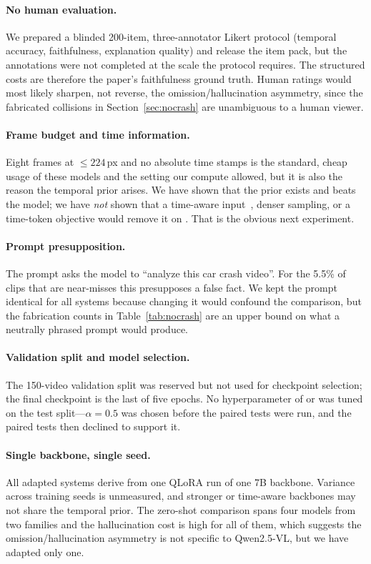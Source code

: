 \paragraph{No human evaluation.}
We prepared a blinded 200-item, three-annotator Likert protocol (temporal accuracy, faithfulness, explanation quality) and release the item pack, but the annotations were not completed at the scale the protocol requires.
The structured costs are therefore the paper's faithfulness ground truth.
Human ratings would most likely sharpen, not reverse, the omission/hallucination asymmetry, since the fabricated collisions in Section~\ref{sec:nocrash} are unambiguous to a human viewer.

\paragraph{Frame budget and time information.}
Eight frames at $\leq224$\,px and no absolute time stamps is the standard, cheap usage of these models and the setting our compute allowed, but it is also the reason the temporal prior arises.
We have shown that the prior exists and beats the model; we have \emph{not} shown that a time-aware input~\cite{timechat,vtimellm,lita}, denser sampling, or a time-token objective would remove it on \dataset{}.
That is the obvious next experiment.

\paragraph{Prompt presupposition.}
The prompt asks the model to ``analyze this car crash video''.
For the 5.5\% of clips that are near-misses this presupposes a false fact.
We kept the prompt identical for all systems because changing it would confound the comparison, but the fabrication counts in Table~\ref{tab:nocrash} are an upper bound on what a neutrally phrased prompt would produce.

\paragraph{Validation split and model selection.}
The 150-video validation split was reserved but not used for checkpoint selection; the final checkpoint is the last of five epochs.
No hyperparameter of \crashlogic{} or \tcd{} was tuned on the test split---$\alpha{=}0.5$ was chosen before the paired tests were run, and the paired tests then declined to support it.

\paragraph{Single backbone, single seed.}
All adapted systems derive from one QLoRA run of one 7B backbone.
Variance across training seeds is unmeasured, and stronger or time-aware backbones may not share the temporal prior.
The zero-shot comparison spans four models from two families and the hallucination cost is high for all of them, which suggests the omission/hallucination asymmetry is not specific to Qwen2.5-VL, but we have adapted only one.

